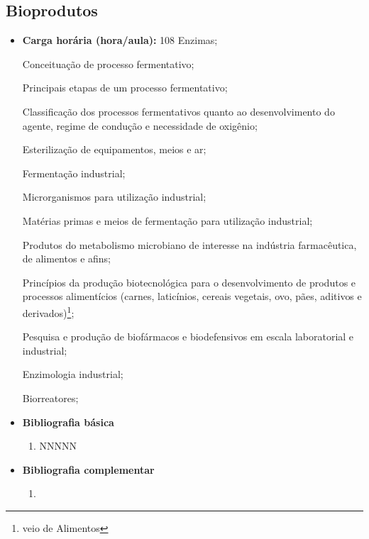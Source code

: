 \documentclass[11pt,fleqn]{book} %
\newcommand{\VER}[1]{\begingroup\color{red}#1\endgroup}
\begin{document}
\subsection{Bioprodutos}\label{disc:bioprodutos}
\begin{itemize}
	\item \textbf{Carga horária (hora/aula):} 108
	Enzimas;
	
	Conceituação de processo fermentativo; 
	
	Principais etapas de um processo fermentativo; 
	
	Classificação dos processos fermentativos quanto ao desenvolvimento do agente, regime de condução e necessidade de oxigênio;
	
	Esterilização de equipamentos, meios e ar;
	
	Fermentação industrial;
	
	Microrganismos para utilização industrial; 
	
	Matérias primas e meios de fermentação para utilização industrial; 
	
	Produtos do metabolismo microbiano de interesse na indústria farmacêutica, de alimentos e afins; 
	
	\VER{
	Princípios da produção biotecnológica para o desenvolvimento de produtos e processos alimentícios (carnes, laticínios, cereais vegetais, ovo, pães, aditivos e derivados)\footnote{veio de Alimentos};}
	
	Pesquisa e produção de biofármacos e biodefensivos em escala laboratorial e industrial;
	
	Enzimologia industrial; 
	
	Biorreatores;
	
	\item \textbf{Bibliografia básica}
	\begin{enumerate}
		\item NNNNN
	\end{enumerate}
	\item \textbf{Bibliografia complementar}
	\begin{enumerate}
		\item 
	\end{enumerate}	
\end{itemize}
\end{document}
